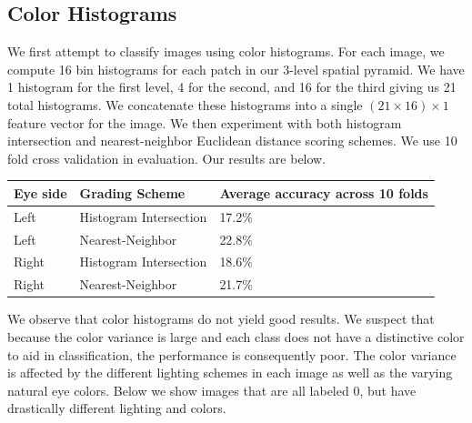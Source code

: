 \documentclass{article} %
\begin{document}
\subsection{Color Histograms}

We first attempt to classify images using color histograms. For each image, we compute 16 bin histograms for each patch in our 3-level spatial pyramid. We have 1 histogram for the first level, 4 for the second, and 16 for the third giving us 21 total histograms. We concatenate these histograms into a single $(21 \times 16) \times 1$ feature vector for the image. We then experiment with both histogram intersection and nearest-neighbor Euclidean distance scoring schemes. We use 10 fold cross validation in evaluation. Our results are below.

\begin{tabular}{| l | l | l |}
\hline
Eye side & Grading Scheme & Average accuracy across 10 folds \\ \hline
Left & Histogram Intersection & 17.2\% \\ \hline
Left & Nearest-Neighbor & 22.8\% \\ \hline
Right & Histogram Intersection & 18.6\% \\ \hline
Right & Nearest-Neighbor & 21.7\% \\ \hline
\end{tabular} 

We observe that color histograms do not yield good results. We suspect that because the color variance is large and each class does not have a distinctive color to aid in classification, the performance is consequently poor. The color variance is affected by the different lighting schemes in each image as well as the varying natural eye colors. Below we show images that are all labeled 0, but have drastically different lighting and colors.

\newpage
\end{document}
